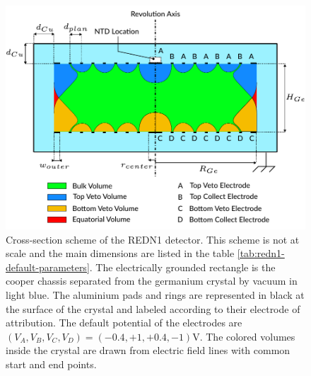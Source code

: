 \begin{figure}
\centering
\includegraphics[scale=1]{Figures/ElectrodesExperimental/scheme_redn1.pdf}
\caption{Cross-section scheme of the REDN1 detector. This scheme is not at scale and the main dimensions are listed in the table \ref{tab:redn1-default-parameters}. The electrically grounded rectangle is the cooper chassis separated from the germanium crystal by vacuum in light blue. The aluminium pads and rings are represented in black at the surface of the crystal and labeled according to their electrode of attribution. The default potential of the electrodes are $(V_A, V_B, V_C, V_D) = (-0.4, +1, +0.4, -1) \si{\volt}$. The colored volumes inside the crystal are drawn from electric field lines with common start and end points.}
\label{fig:redn1-scheme}
\end{figure}

